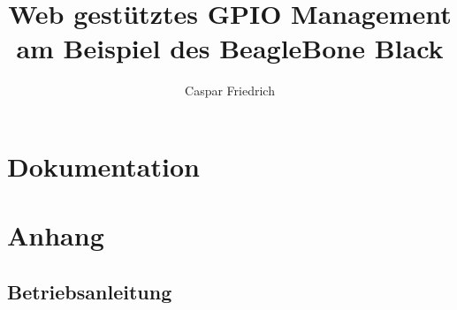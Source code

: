 \documentclass[a4paper, oneside, 12pt, bibliography=totocnumbered]{scrbook}
\author{Caspar Friedrich}
\title{Web gestütztes GPIO Management am Beispiel des BeagleBone Black}
\begin{document}



\newpage
\newpage

\tableofcontents

\part{Dokumentation}








\appendix
\part{Anhang}
\chapter{Betriebsanleitung}






\printglossary[title={Glossar}]


\end{document}
